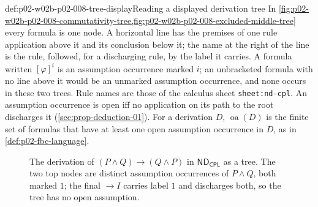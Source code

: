 \begin{hbconvention}{def:p02-w02b-p02-008-tree-display}{Reading a displayed derivation tree}
In \cref{fig:p02-w02b-p02-008-commutativity-tree,fig:p02-w02b-p02-008-excluded-middle-tree}
every formula is one node.  A horizontal line has the premises of one rule
application above it and its conclusion below it; the name at the right of
the line is the rule, followed, for a discharging rule, by the label it
carries.  A formula written \([\varphi]^i\) is an assumption occurrence
marked \(i\); an unbracketed formula with no line above it would be an
unmarked assumption occurrence, and none occurs in these two trees.  Rule
names are those of the calculus sheet
\texttt{sheet:\allowbreak nd-cpl}.  An assumption occurrence is open iff no
application on its path to the root discharges it
(\cref{sec:prop-deduction-01}).  For a derivation \(D\),
\(\operatorname{oa}(D)\) is the finite set of formulas that have at least one
open assumption occurrence in \(D\), as in \cref{def:p02-fbc-language}.
\end{hbconvention}

\begin{figure}[htbp]
\centering
{}
\caption{The derivation of \((P\land Q)\to(Q\land P)\) in
\(\mathsf{ND}_{\mathsf{CPL}}\) as a tree.  The two top nodes are distinct
assumption occurrences of \(P\land Q\), both marked \(1\); the final
\(\to I\) carries label \(1\) and discharges both, so the tree has no open
assumption.}
\label{fig:p02-w02b-p02-008-commutativity-tree}
\end{figure}

